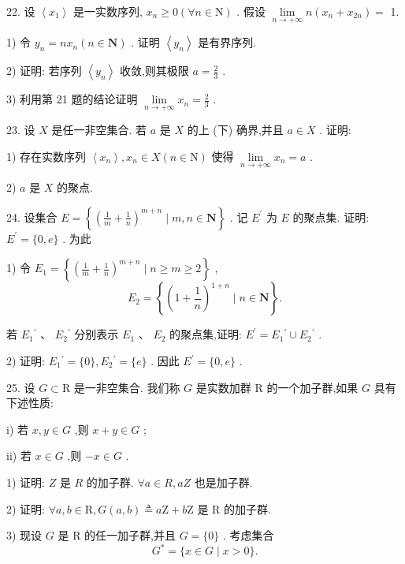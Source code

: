 22. 设 $\left\langle  {x}_{1}\right\rangle$ 是一实数序列, ${x}_{n} \geq  0\left( {\forall n \in  \mathrm{N}}\right)$ . 假设 $\mathop{\lim }\limits_{{n \rightarrow   + \infty }}n\left( {{x}_{n} + {x}_{2n}}\right)  =$ 1.

1) 令 ${y}_{n} = n{x}_{n}\left( {n \in  \mathbf{N}}\right)$ . 证明 $\left\langle  {y}_{n}\right\rangle$ 是有界序列.

2) 证明: 若序列 $\left\langle  {y}_{n}\right\rangle$ 收敛,则其极限 $a = \frac{2}{3}$ .

3) 利用第 21 题的结论证明 $\mathop{\lim }\limits_{{n \rightarrow   + \infty }}{x}_{n} = \frac{2}{3}$ .

23. 设 $X$ 是任一非空集合. 若 $a$ 是 $X$ 的上 (下) 确界,并且 $a \in  X$ . 证明:

1) 存在实数序列 $\left\langle  {x}_{n}\right\rangle  ,{x}_{n} \in  X\left( {n \in  \mathrm{N}}\right)$ 使得 $\mathop{\lim }\limits_{{n \rightarrow   + \infty }}{x}_{n} = a$ .

2) $a$ 是 $X$ 的聚点.

24. 设集合 $E = \left\{  {{\left( \frac{1}{m} + \frac{1}{n}\right) }^{m + n} \mid  m,n \in  \mathbf{N}}\right\}$ . 记 ${E}^{\prime }$ 为 $E$ 的聚点集. 证明: ${E}^{\prime } = \{ 0,e\}$ . 为此

1) 令 ${E}_{1} = \left\{  {{\left( \frac{1}{m} + \frac{1}{n}\right) }^{m + n} \mid  n \geq  m \geq  2}\right\}$ ,
$${E}_{2} = \left\{  {{\left( 1 + \frac{1}{n}\right) }^{1 + n} \mid  n \in  \mathbf{N}}\right\}  .$$

若 ${E}_{1}{}^{\prime }\text{ 、 }{E}_{2}{}^{\prime }$ 分别表示 ${E}_{1}\text{ 、 }{E}_{2}$ 的聚点集,证明: ${E}^{\prime } = {E}_{1}{}^{\prime } \cup  {E}_{2}{}^{\prime }$ .

2) 证明: ${E}_{1}{}^{\prime } = \{ 0\} ,{E}_{2}{}^{\prime } = \{ e\}$ . 因此 ${E}^{\prime } = \{ 0,e\}$ .

25. 设 $G \subset  \mathrm{R}$ 是一非空集合. 我们称 $G$ 是实数加群 $\mathrm{R}$ 的一个加子群,如果 $G$ 具有下述性质:

i) 若 $x,y \in  G$ ,则 $x + y \in  G$ ;

ii) 若 $x \in  G$ ,则 $- x \in  G$ .

1) 证明: $Z$ 是 $R$ 的加子群. $\forall a \in  R,{aZ}$ 也是加子群.

2) 证明: $\forall a,b \in  \mathrm{R},G\left( {a,b}\right)  \triangleq  a\mathrm{Z} + b\mathrm{Z}$ 是 $\mathrm{R}$ 的加子群.

3) 现设 $G$ 是 $\mathrm{R}$ 的任一加子群,并且 $G = \{ 0\}$ . 考虑集合
$${G}^{ * } = \{ x \in  G \mid  x > 0\} .$$

